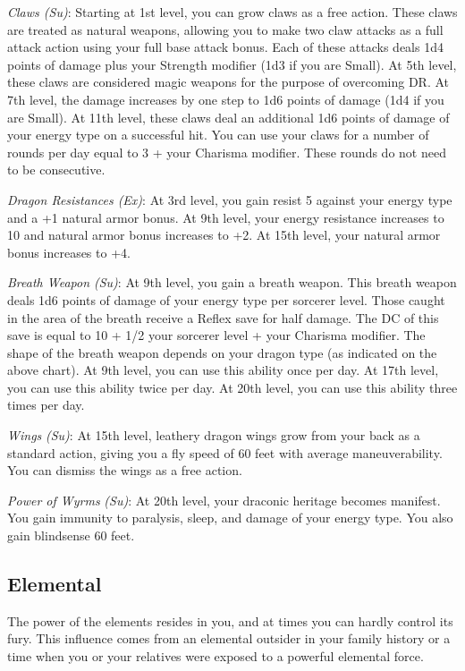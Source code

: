 \textit{Claws (Su)}: Starting at 1st level, you can grow claws as a free action. These claws are treated as natural weapons, 
allowing you to make two claw attacks as a full attack action using your full base attack bonus. Each of these attacks deals 
1d4 points of damage plus your Strength modifier (1d3 if you are Small). At 5th level, these claws are considered magic weapons 
for the purpose of overcoming DR. At 7th level, the damage increases by one step to 1d6 points of damage (1d4 if you are Small).
At 11th level, these claws deal an additional 1d6 points of damage of your energy type on a successful hit. You can use your claws
for a number of rounds per day equal to 3 + your Charisma modifier. These rounds do not need to be consecutive.
				
\textit{Dragon Resistances (Ex)}: At 3rd level, you gain resist 5 against your energy type and a +1 natural armor bonus. At 9th 
level, your energy resistance increases to 10 and natural armor bonus increases to +2. At 15th level, your natural armor bonus 
increases to +4.
				
\textit{Breath Weapon (Su)}: At 9th level, you gain a breath weapon. This breath weapon deals 1d6 points of damage of your energy
type per sorcerer level. Those caught in the area of the breath receive a Reflex save for half damage. The DC of this save is equal
to 10 + 1/2 your sorcerer level + your Charisma modifier. The shape of the breath weapon depends on your dragon type (as indicated
on the above chart). At 9th level, you can use this ability once per day. At 17th level, you can use this ability twice per day. At
20th level, you can use this ability three times per day.
				
\textit{Wings} \textit{(Su)}: At 15th level, leathery dragon wings grow from your back as a standard action, giving you a fly speed
of 60 feet with average maneuverability. You can dismiss the wings as a free action.
				
\textit{Power of Wyrms} \textit{(Su)}: At 20th level, your draconic heritage becomes manifest. You gain immunity to paralysis, sleep,
and damage of your energy type. You also gain blindsense 60 feet.
				
\subsection{Elemental}

				
The power of the elements resides in you, and at times you can hardly control its fury. This influence comes from an elemental
outsider in your family history or a time when you or your relatives were exposed to a powerful elemental force.
				
